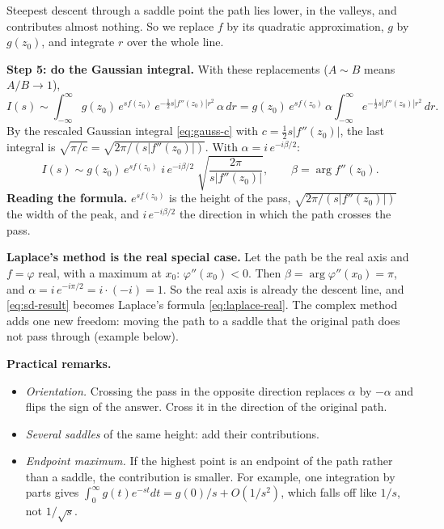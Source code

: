 \documentclass[11pt]{beamer}
\begin{document}
\begin{frame}[allowframebreaks=1.00]{Steepest descent through a saddle point}
the path lies lower, in the valleys, and contributes almost nothing. So we replace \(f\) by its
quadratic approximation, \(g\) by \(g(z_0)\), and integrate \(r\) over the whole line.
\par\framebreak\par
\textbf{Step 5: do the Gaussian integral.} With these replacements (\(A\sim B\) means \(A/B\to1\)),
\[
  I(s)\sim\int_{-\infty}^{\infty}g(z_0)\,e^{sf(z_0)}\,e^{-\frac12 s|f''(z_0)|r^2}\,\alpha\,dr
  =g(z_0)\,e^{sf(z_0)}\,\alpha\int_{-\infty}^{\infty}e^{-\frac12 s|f''(z_0)|r^2}\,dr .
\]
By the rescaled Gaussian integral \eqref{eq:gauss-c} with \(c=\tfrac12 s|f''(z_0)|\), the last integral is
\(\sqrt{\pi/c}=\sqrt{2\pi/(s|f''(z_0)|)}\). With \(\alpha=i\,e^{-i\beta/2}\):
\begin{equation}
  I(s)\sim
  g(z_0)\,e^{sf(z_0)}\;i\,e^{-i\beta/2}\;
  \sqrt{\frac{2\pi}{s|f''(z_0)|}},
  \qquad \beta=\arg f''(z_0).
  \label{eq:sd-result}
\end{equation}
\textbf{Reading the formula.} \(e^{sf(z_0)}\) is the height of the pass, \(\sqrt{2\pi/(s|f''(z_0)|)}\) the width of
the peak, and \(i\,e^{-i\beta/2}\) the direction in which the path crosses the pass.
\par\framebreak\par
\textbf{Laplace's method is the real special case.} Let the path be the real axis and \(f=\varphi\) real,
with a maximum at \(x_0\): \(\varphi''(x_0)<0\). Then \(\beta=\arg\varphi''(x_0)=\pi\), and
\(\alpha=i\,e^{-i\pi/2}=i\cdot(-i)=1\). So the real axis is already the descent line, and
\eqref{eq:sd-result} becomes Laplace's formula \eqref{eq:laplace-real}. The complex method adds one new
freedom: moving the path to a saddle that the original path does not pass through (example below).

\textbf{Practical remarks.}
\begin{itemize}
  \item \emph{Orientation.} Crossing the pass in the opposite direction replaces \(\alpha\) by \(-\alpha\) and flips
        the sign of the answer. Cross it in the direction of the original path.
  \item \emph{Several saddles} of the same height: add their contributions.
  \item \emph{Endpoint maximum.} If the highest point is an endpoint of the path rather than a saddle,
        the contribution is smaller. For example, one integration by parts gives
        \(\int_0^\infty g(t)e^{-st}dt=g(0)/s+O(1/s^2)\), which falls off like \(1/s\), not \(1/\sqrt s\).
\end{itemize}
\end{frame}
\end{document}
